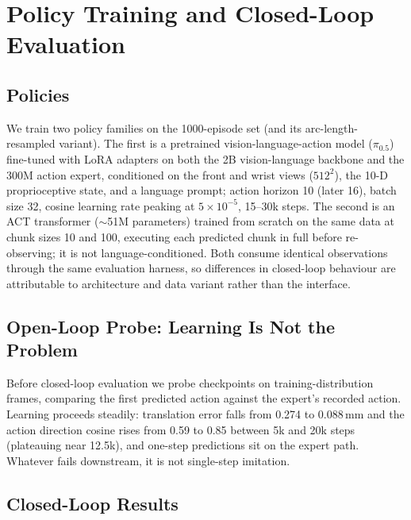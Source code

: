 

\section{Policy Training and Closed-Loop Evaluation}

\subsection{Policies}

We train two policy families on the 1000-episode set (and its
arc-length-resampled variant). The first is a pretrained
vision-language-action model ($\pi_{0.5}$) fine-tuned with LoRA
adapters on both the 2B vision-language backbone and the 300M action
expert, conditioned on the front and wrist views ($512^2$), the 10-D
proprioceptive state, and a language prompt; action horizon 10
(later 16), batch size 32, cosine learning rate peaking at
$5\times10^{-5}$, 15--30k steps. The second is an ACT transformer
($\sim$51M parameters) trained from scratch on the same data at
chunk sizes 10 and 100, executing each predicted chunk in full
before re-observing; it is not language-conditioned. Both consume
identical observations through the same evaluation harness, so
differences in closed-loop behaviour are attributable to
architecture and data variant rather than the interface.

\subsection{Open-Loop Probe: Learning Is Not the Problem}

Before closed-loop evaluation we probe checkpoints on
training-distribution frames, comparing the first predicted action
against the expert's recorded action. Learning proceeds steadily:
translation error falls from 0.274 to 0.088\,mm and the action
direction cosine rises from 0.59 to 0.85 between 5k and 20k steps
(plateauing near 12.5k), and one-step predictions sit on the expert
path. Whatever fails downstream, it is not single-step imitation.

\subsection{Closed-Loop Results}

